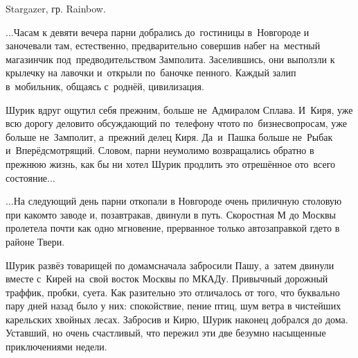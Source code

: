 {\raggedleft \scriptsize \mdash Stargazer, гр. Rainbow. \par}


\newpage
$\ldots$Часам к девяти вечера парни добрались до~гостиницы в~Новгороде и заночевали там, естественно, предварительно совершив набег на~местный магазинчик под~предводительством Замполита. Заселившись, они выползли к крылечку на лавочки и~открыли по~баночке пенного. Каждый залип в~мобильник, общаясь с~роднёй, цивилизация. 

Шурик вдруг ощутил себя прежним, больше не~Адмиралом Сплава. И~Киря, уже всю дорогу деловито обсуждающий по~телефону что\sdash то по~бизнес\sdash вопросам, уже больше не~Замполит, а~прежний делец Киря. Да~и~Пашка больше не~Рыбак и~Вперёдсмотрящий. Словом, парни неумолимо возвращались обратно в прежнюю жизнь, как бы ни хотел Шурик продлить это отрешённое ото~всего состояние$\ldots$

$\ldots$На следующий день парни откопали в Новгороде очень приличную столовую при каком\sdash то заводе и, позавтракав, двинули в путь. Скоростная М до Москвы пролетела почти как одно мгновение, прерванное только автозаправкой где\sdash то в районе Твери.

Шурик развёз товарищей по домам\mdash сначала забросили Пашу, а~затем двинули вместе с~Кирей на~свой восток Москвы по МКАДу. Привычный дорожный траффик, пробки, суета. Как разительно это отличалось от того, что буквально пару дней назад было у них: спокойствие, пение птиц, шум ветра в чистейших карельских хвойных лесах. Забросив и Кирю, Шурик наконец добрался до дома. Уставший, но очень счастливый, что пережил эти две безумно насыщенные приключениями недели.





%
%
%
%
%



\begin{center}
\end{center}
